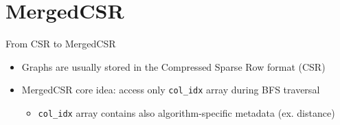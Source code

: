 \section{MergedCSR}

\begin{frame}{From CSR to MergedCSR}
\begin{itemize}
  \item<1-> Graphs are usually stored in the Compressed Sparse Row format (CSR)
  \item<2-> MergedCSR core idea: access only \texttt{col\_idx} array during BFS traversal
  \begin{itemize}
    \item<2-> \texttt{col\_idx} array contains also algorithm-specific metadata (ex. distance)
  \end{itemize}
\end{itemize}
\end{frame}
